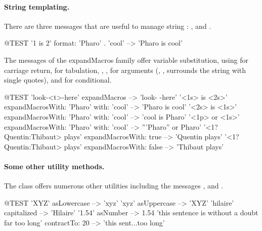 \documentclass[a4paper,10pt,twoside]{book}
\begin{document}

\paragraph{String templating.}
There are three messages that are useful to manage string : ,  and .

\begin{code}{@TEST}
'{1} is {2}' format: {'Pharo' . 'cool'}  --> 'Pharo is cool'
\end{code}

The messages of the expandMacros family offer variable substitution, using  for carriage return,  for tabulation, , ,  for arguments (, , surrounds the string with single quotes), and  for conditional.

\begin{code}{@TEST}
'look-<t>-here' expandMacros                                         --> 'look-	-here'
'<1s> is <2s>' expandMacrosWith: 'Pharo' with: 'cool'   --> 'Pharo is cool'
'<2s> is <1s>' expandMacrosWith: 'Pharo' with: 'cool'   --> 'cool is Pharo'
'<1p> or <1s>' expandMacrosWith: 'Pharo' with: 'cool'  --> '''Pharo'' or Pharo'
'<1?Quentin:Thibaut> plays' expandMacrosWith: true     --> 'Quentin plays'
'<1?Quentin:Thibaut> plays' expandMacrosWith: false    --> 'Thibaut plays'
\end{code}

\paragraph{Some other utility methods.}
The class  offers numerous other utilities including the messages ,  and . 

\begin{code}{@TEST}
'XYZ' asLowercase --> 'xyz'
'xyz' asUppercase   --> 'XYZ'
'hilaire' capitalized   --> 'Hilaire'
'1.54' asNumber      --> 1.54
'this sentence is without a doubt far too long' contractTo: 20 --> 'this sent...too long'
\end{code}
\end{document}
